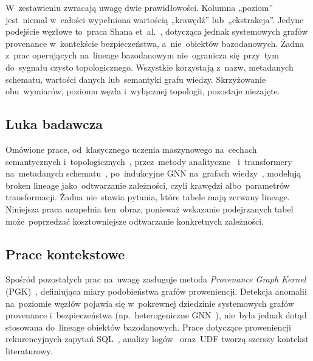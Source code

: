 \documentclass[polish,master,a4paper,oneside]{ppfcmthesis}
\renewcommand{\_}{\origtextunderscore\ifmmode\else\allowbreak\fi}
\begin{document}
W~zestawieniu zwracają uwagę dwie prawidłowości. Kolumna „poziom'' jest~niemal
w~całości wypełniona wartością „krawędź'' lub~„ekstrakcja''. Jedyne
podejście węzłowe to~praca Shana et~al.~\cite{Shan2024}, dotycząca jednak
systemowych grafów provenance w~kontekście bezpieczeństwa, a~nie~obiektów
bazodanowych. Żadna z~prac operujących na~lineage bazodanowym
nie~ogranicza się~przy~tym do~sygnału czysto topologicznego. Wszystkie
korzystają z~nazw, metadanych schematu, wartości danych lub~semantyki grafu
wiedzy. Skrzyżowanie obu~wymiarów, poziomu węzła i~wyłącznej topologii,
pozostaje niezajęte.

\subsection{Luka badawcza}
Omówione prace, od~klasycznego uczenia maszynowego na~cechach
semantycznych i~topologicznych~\cite{Boinski2025}, przez~metody
analityczne~\cite{Andrzejewski2026} i~transformery na~metadanych
schematu~\cite{Brzeski2025}, po~indukcyjne GNN na~grafach
wiedzy~\cite{Dutkiewicz2026}, modelują broken lineage jako~odtwarzanie
zależności, czyli krawędzi albo~parametrów transformacji. Żadna nie~stawia
pytania, które tabele mają zerwany lineage. Niniejsza praca uzupełnia
ten~obraz, ponieważ wskazanie podejrzanych tabel może~poprzedzać
kosztowniejsze odtwarzanie konkretnych zależności.

\subsection{Prace kontekstowe}
Spośród pozostałych prac na~uwagę zasługuje metoda \emph{Provenance Graph
Kernel} (PGK)~\cite{KohanMarzagao2025}, definiująca miary podobieństwa
grafów proweniencji. Detekcja anomalii na~poziomie węzłów pojawia się
w~pokrewnej dziedzinie systemowych grafów provenance i~bezpieczeństwa
(np.~heterogeniczne GNN~\cite{Shan2024}), nie~była jednak dotąd stosowana
do~lineage obiektów bazodanowych. Prace dotyczące proweniencji rekurencyjnych
zapytań SQL~\cite{Dietrich2022}, analizy logów~\cite{Psallidas2023} oraz~UDF
\cite{Yamada2023} tworzą szerszy kontekst literaturowy.



\end{document}
